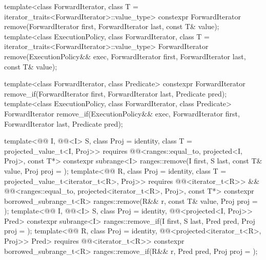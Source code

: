 %
%
\begin{itemdecl}
template<class ForwardIterator, class T = iterator_traits<ForwardIterator>::value_type>
  constexpr ForwardIterator remove(ForwardIterator first, ForwardIterator last,
                                   const T& value);
template<class ExecutionPolicy, class ForwardIterator,
         class T = iterator_traits<ForwardIterator>::value_type>
  ForwardIterator remove(ExecutionPolicy&& exec,
                         ForwardIterator first, ForwardIterator last,
                         const T& value);

template<class ForwardIterator, class Predicate>
  constexpr ForwardIterator remove_if(ForwardIterator first, ForwardIterator last,
                                      Predicate pred);
template<class ExecutionPolicy, class ForwardIterator, class Predicate>
  ForwardIterator remove_if(ExecutionPolicy&& exec,
                            ForwardIterator first, ForwardIterator last,
                            Predicate pred);

template<@@ I, @@<I> S, class Proj = identity,
         class T = projected_value_t<I, Proj>>
  requires @@<ranges::equal_to, projected<I, Proj>, const T*>
  constexpr subrange<I> ranges::remove(I first, S last, const T& value, Proj proj = {});
template<@@ R, class Proj = identity,
         class T = projected_value_t<iterator_t<R>, Proj>>
  requires @@<iterator_t<R>> &&
           @@<ranges::equal_to, projected<iterator_t<R>, Proj>, const T*>
  constexpr borrowed_subrange_t<R>
    ranges::remove(R&& r, const T& value, Proj proj = {});
template<@@ I, @@<I> S, class Proj = identity,
         @@<projected<I, Proj>> Pred>
  constexpr subrange<I> ranges::remove_if(I first, S last, Pred pred, Proj proj = {});
template<@@ R, class Proj = identity,
         @@<projected<iterator_t<R>, Proj>> Pred>
  requires @@<iterator_t<R>>
  constexpr borrowed_subrange_t<R>
    ranges::remove_if(R&& r, Pred pred, Proj proj = {});
\end{itemdecl}

